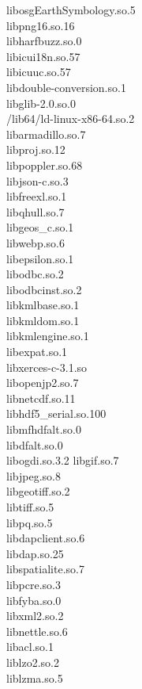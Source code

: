 \begin{multicols}{2}
libosgEarthSymbology.so.5 \\
libpng16.so.16 \\
libharfbuzz.so.0 \\
libicui18n.so.57 \\
libicuuc.so.57 \\
libdouble-conversion.so.1 \\
libglib-2.0.so.0 \\
/lib64/ld-linux-x86-64.so.2 \\
libarmadillo.so.7 \\
libproj.so.12 \\
libpoppler.so.68 \\
libjson-c.so.3 \\
libfreexl.so.1 \\
libqhull.so.7 \\
libgeos\_c.so.1 \\
libwebp.so.6 \\
libepsilon.so.1 \\
libodbc.so.2 \\
libodbcinst.so.2 \\
libkmlbase.so.1 \\
libkmldom.so.1 \\
libkmlengine.so.1 \\
libexpat.so.1 \\
libxerces-c-3.1.so \\
libopenjp2.so.7 \\
libnetcdf.so.11 \\
libhdf5\_serial.so.100 \\
libmfhdfalt.so.0 \\
libdfalt.so.0 \\
libogdi.so.3.2
libgif.so.7 \\
libjpeg.so.8 \\
libgeotiff.so.2 \\
libtiff.so.5 \\
libpq.so.5 \\
libdapclient.so.6 \\
libdap.so.25 \\
libspatialite.so.7 \\
libpcre.so.3 \\
libfyba.so.0 \\
libxml2.so.2 \\
libnettle.so.6 \\
libacl.so.1 \\
liblzo2.so.2 \\
liblzma.so.5 \\

\end{multicols}
